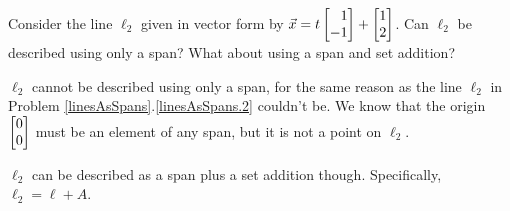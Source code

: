 \documentclass{problemset}
\begin{document}
\begin{parts}
\begin{solution}
			\end{solution}
		\item Consider the line $\ell_2$ given in vector form by $\vec x=t\mat{1\\-1}+\mat{1\\2}$.
			Can $\ell_2$ be described using only a span? What about using a span
			and set addition?
			\begin{solution}
				$\ell_2$ cannot be described using only a span, for the same reason
				as the line $\ell_2$ in Problem \ref{linesAsSpans}.\ref{linesAsSpans.2}
				couldn't be. We know that the origin $\mat{0\\0}$ must be an element
				of any span, but it is not a point on $\ell_2$.

				$\ell_2$ can be described as a span plus a set addition though.
				Specifically, $\ell_2=\ell + A$.
			\end{solution}
	\end{parts}
\end{document}
